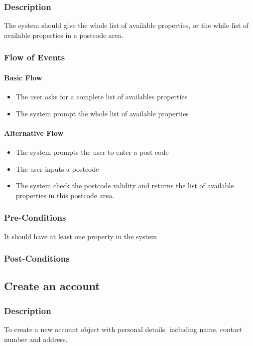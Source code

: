 \documentclass[a4paper,12pt]{article}
\begin{document}
\subsubsection{Description}
The system should give the whole list of available properties, or the while list of available properties in a postcode area.
\subsubsection{Flow of Events}
\paragraph{Basic Flow}
\begin{itemize}
\item The user asks for a complete list of availables properties
\item The system prompt the whole list of available properties
\end{itemize}

\paragraph{Alternative Flow}
\begin{itemize}
\item The system prompts the user to enter a post code
\item The user inputs a postcode
\item The system check the postcode validity and returns the list of available properties in this postcode area.
\end{itemize}

\subsubsection{Pre-Conditions}
It should have at least one property in the system
\subsubsection{Post-Conditions}


\subsection{Create an account}
\subsubsection{Description}
To create a new account object with personal details, including name, contact number and address.
\end{document}
